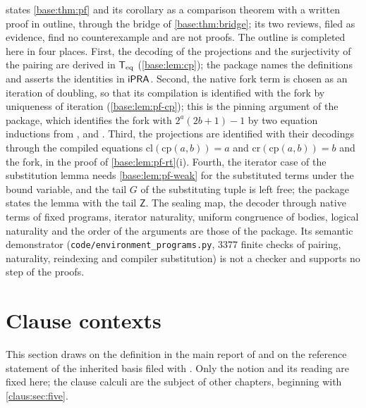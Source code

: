\begin{remark}
\label{base:rem:pf-sources}
 states \cref{base:thm:pf} and its corollary as a
comparison theorem with a written proof in outline, through the bridge of
\cref{base:thm:bridge}; its two reviews, filed as evidence, find no
counterexample and are not proofs.  The outline is completed here in four
places.
First, the decoding of the projections and the surjectivity of the
pairing are derived in $\mathsf{T}_{\mathrm{eq}}$ (\cref{base:lem:cp}); the package names the
definitions and asserts the identities in $\mathsf{iPRA}$.  Second, the native
fork term is chosen as an iteration of doubling, so that its compilation
is identified with the fork by uniqueness of iteration
(\cref{base:lem:pf-cp}); this is the pinning argument of the package,
which identifies the fork with $2^{a}(2b+1)-1$ by two equation inductions
from ,  and .  Third, the
projections are identified with their decodings through the compiled
equations $\mathrm{cl}(\mathrm{cp}(a,b))=a$ and $\mathrm{cr}(\mathrm{cp}(a,b))=b$
and the fork, in the proof of \cref{base:lem:pf-rt}(i).  Fourth, the
iterator case of the substitution lemma needs \cref{base:lem:pf-weak} for
the substituted terms under the bound variable, and the tail $G$ of the
substituting tuple is left free; the package states the lemma with the
tail $\mathsf Z$.  The sealing map, the decoder through native terms of
fixed programs, iterator naturality, uniform congruence of bodies, logical
naturality and the order of the arguments are those of the package.  Its
semantic demonstrator (\texttt{code/environment\_programs.py}, $3377$
finite checks of pairing, naturality, reindexing and compiler
substitution) is not a checker and supports no step of the proofs.
\end{remark}

\section{Clause contexts}
\label{base:sec:clauses}

This section draws on the definition in the main report of
 and on the reference statement of the inherited basis
filed with .  Only the notion and its reading are fixed
here; the clause calculi are the subject of other chapters, beginning with
\cref{claus:sec:five}.

